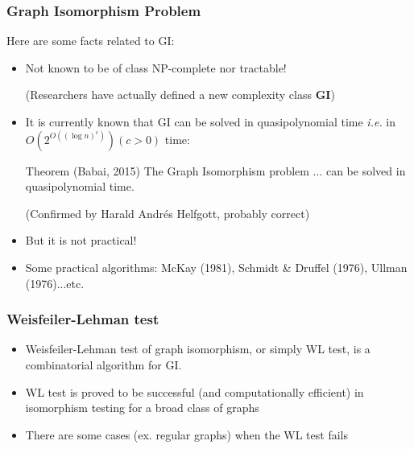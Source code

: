 \documentclass[handout]{beamer}
\begin{document}
\begin{frame}
\frametitle{Graph Isomorphism Problem}

Here are some facts related to \textsc{GI}:

\begin{itemize}
	\item Not known to be of class NP-complete nor tractable!
	
	(Researchers have actually defined a new complexity class {\bf GI}) \pause
	
	\item It is currently known that \textsc{GI} can be solved in quasipolynomial time {\it i.e.} in $O \left( 2^{O \left( \left( \log n \right)^c \right)} \right) (c > 0)$ time: \pause
	
\begin{block}{Theorem (Babai, 2015)}
The Graph Isomorphism problem ... can be solved in quasipolynomial time.
	\end{block}
(Confirmed by Harald Andr\'es Helfgott, probably correct)	
	 \pause

	\item But it is not practical! \pause
	
	\item Some practical algorithms: McKay (1981), Schmidt \& Druffel (1976), Ullman (1976)...etc.
\end{itemize}

\end{frame}

\begin{frame}
\frametitle{Weisfeiler-Lehman test}

\begin{itemize}
	\item Weisfeiler-Lehman test of graph isomorphism, or simply WL test, is a combinatorial algorithm for \textsc{GI}. \pause
	
	\item WL test is proved to be successful (and computationally efficient) in isomorphism testing for a broad class of graphs \pause
	
	\item There are some cases (ex. regular graphs) when the WL test fails
\end{itemize}

\end{frame}
\end{document}
